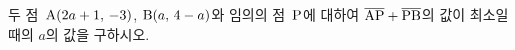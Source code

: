 두 점~$\mathrm{A}(2a+1,\mkern3mu -3)$, $\mathrm{B}(a,\mkern3mu 4-a)$와 임의의 점~$\mathrm{P}$에 대하여 $\overline{\mathrm{AP}}+\overline{\mathrm{PB}}$의 값이 최소일 때의 $a$의 값을 구하시오.
